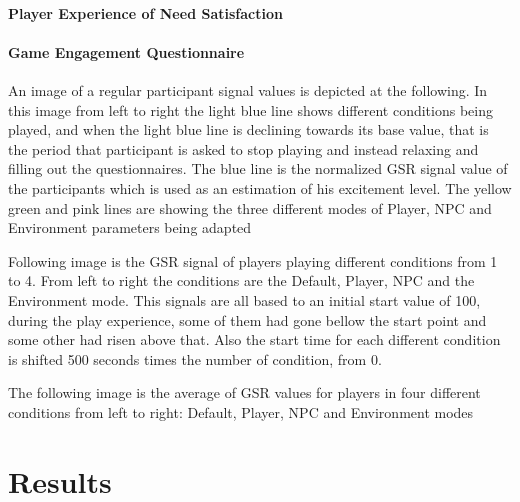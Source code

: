 \paragraph{Player Experience of Need Satisfaction}


\paragraph{Game Engagement Questionnaire}

An image of a regular participant signal values is depicted at
the following. In this image from left to right the light blue line
shows different conditions being played, and when the light blue
line is declining towards its base value, that is the period that
participant is asked to stop playing and instead relaxing and filling
out the questionnaires. The blue line is the normalized GSR signal
value of the participants which is used as an estimation of his
excitement level. The yellow green and pink lines are showing the
three different modes of Player, NPC and Environment parameters
being adapted

Following image is the GSR signal of players playing different
conditions from 1 to 4. From left to right the conditions are the
Default, Player, NPC and the Environment mode. This signals are all
based to an initial start value of 100, during the play experience,
some of them had gone bellow the start point and some other had risen
above that. Also the start time for each different condition is
shifted 500 seconds times the number of condition, from 0.

The following image is the average of GSR values for players in four
different conditions from left to right: Default, Player, NPC and
Environment modes

\section{Results}



